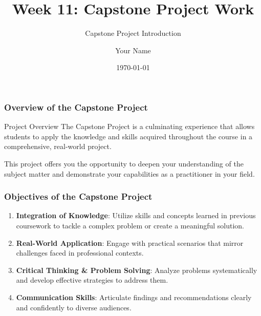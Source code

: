 \documentclass[aspectratio=169]{beamer}
\begin{document}
\frame{\titlepage}

\begin{frame}[fragile]
    \title{Week 11: Capstone Project Work}
    \subtitle{Capstone Project Introduction}
    \author{Your Name}
    \date{\today}
    \titlepage
\end{frame}

\begin{frame}[fragile]
    \frametitle{Overview of the Capstone Project}
    \begin{block}{Project Overview}
        The Capstone Project is a culminating experience that allows students to apply the knowledge and skills acquired throughout the course in a comprehensive, real-world project. 
    \end{block}
    This project offers you the opportunity to deepen your understanding of the subject matter and demonstrate your capabilities as a practitioner in your field.
\end{frame}

\begin{frame}[fragile]
    \frametitle{Objectives of the Capstone Project}
    \begin{enumerate}
        \item \textbf{Integration of Knowledge}: Utilize skills and concepts learned in previous coursework to tackle a complex problem or create a meaningful solution.
        
        \item \textbf{Real-World Application}: Engage with practical scenarios that mirror challenges faced in professional contexts.
        
        \item \textbf{Critical Thinking \& Problem Solving}: Analyze problems systematically and develop effective strategies to address them.
        
        \item \textbf{Communication Skills}: Articulate findings and recommendations clearly and confidently to diverse audiences.
    \end{enumerate}
\end{frame}
\end{document}
